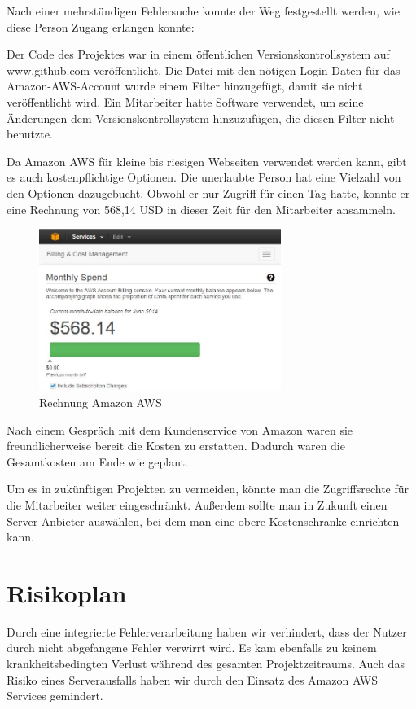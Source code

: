 \documentclass{article}
\begin{document}
Nach einer mehrstündigen Fehlersuche konnte der Weg festgestellt werden, wie diese Person Zugang erlangen konnte: 

Der Code des Projektes war in einem öffentlichen Versionskontrollsystem auf www.github.com veröffentlicht. Die Datei mit den nötigen Login-Daten für das Amazon-AWS-Account wurde einem Filter hinzugefügt, damit sie nicht veröffentlicht wird. Ein Mitarbeiter hatte Software verwendet, um seine Änderungen dem Versionskontrollsystem hinzuzufügen, die diesen Filter nicht benutzte.

Da Amazon AWS für kleine bis riesigen Webseiten verwendet werden kann, gibt es auch kostenpflichtige Optionen. Die unerlaubte Person hat eine Vielzahl von den Optionen dazugebucht. Obwohl er nur Zugriff für einen Tag hatte, konnte er eine Rechnung von 568,14 USD in dieser Zeit für den Mitarbeiter ansammeln.

\begin{figure}[H]
    \centering
    \includegraphics[width=0.7\textwidth]{images/amazon-bill.jpg}
    \caption{Rechnung Amazon AWS}
    \label{fig:bill}
\end{figure}

\noindent Nach einem Gespräch mit dem Kundenservice von Amazon waren sie freundlicherweise bereit die Kosten zu erstatten. Dadurch waren die Gesamtkosten am Ende wie geplant.

Um es in zukünftigen Projekten zu vermeiden, könnte man die Zugriffsrechte für die Mitarbeiter weiter eingeschränkt. Außerdem sollte man in Zukunft einen Server-Anbieter auswählen, bei dem man eine obere Kostenschranke einrichten kann.

\section{Risikoplan}

Durch eine integrierte Fehlerverarbeitung haben wir verhindert, dass der Nutzer durch nicht abgefangene Fehler verwirrt wird. Es kam ebenfalls zu keinem krankheitsbedingten Verlust während des gesamten Projektzeitraums. Auch das Risiko eines Serverausfalls haben wir durch den Einsatz des Amazon AWS Services gemindert.
\end{document}
